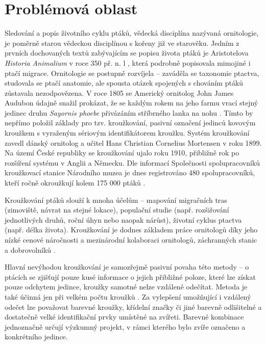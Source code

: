 
\chapter{Problémová oblast}{\tiny }

Sledování a popis životního cyklu ptáků, vědecká disciplína nazývaná ornitologie, je poměrně starou vědeckou disciplínou s kořeny již ve starověku. Jedním z prvních dochovaných textů zabývajícím se popisu života ptáků je Aristotelova \emph{Historia Animalium} v roce 350 př. n. l \cite{historiaAnimalium}, která podrobně popisovala mimojiné i ptačí migrace. Ornitologie se postupně rozvíjela -- zaváděla se taxonomie ptactva, studovala se ptačí anatomie, ale spousta otázek spojených s chováním ptáků zůstavala nezodpovězena. V roce 1805 se Americký ornitolog John James Audubon údajně snažil prokázat, že se každým rokem na jeho farmu vrací stejný jedinec druhu \emph{Sayornis phoebe} přivázáním stříbrného lanka na nohu \cite{halley2018audubon}. Tímto by nepřímo položil základy pro tzv. kroužkování, pasivní označení jedinců kovovým kroužkem s vyraženým sériovým identifikátorem kroužku. Systém kroužkování zavedl dánský ornitolog a učitel Hans Christian Cornelius Mortensen v roku 1899. Na území České republiky se kroužkování ujalo roku 1910, přibližně rok po rozšíření systému v Anglii a Německu. Dle informací Společnosti spolupracovníků kroužkovací stanice Národního muzea je dnes registrováno 480 spolupracovníků, kteří ročně okroužkují kolem 175 000 ptáků \cite{krouzkovaniPtakuHistorie}.

Kroužkování ptáků slouží k mnoha účelům -- mapování migračních tras (zimoviště, návrat na stejné lokace), populační studie (např. rozšiřování jednotlivých druhů, roční úhyn nebo naopak nárůst), životní cyklus ptactva (např. délka života). Kroužkování je dodnes základem práce ornitologů díky jeho nízké cenové náročnosti a mezinárodní kolaboraci ornitologů, záchranných stanic a dobrovolníků \cite{krouzkovaniPtaku}. 

Hlavní nevýhodou kroužkování je samozřejmě pasivní povaha této metody -- o ptácích se zjišťují pouze kusé informace o jejich přibližné poloze, které lze získat pouze odchytem jedince, kroužky samotné nelze vzdáleně odečítat. Metoda je také účinná jen při velkém počtu kroužků \cite{sokolov2011modern}. Za vylepšení umožňující i vzdálený odečet lze považovat barevné kroužky, křídelní značky či jiné barevně odlišitelné a dostatečně velké identifikační prvky umístěné na zvířeti. Barevné kombinace jednoznačně určují výzkumný projekt, v rámci kterého bylo zvíře označeno a konkrétního jedince. 

